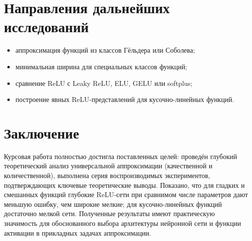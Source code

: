 \documentclass[12pt]{article}
\begin{document}
\section{Направления дальнейших исследований}

\begin{itemize}
	\item аппроксимация функций из классов Гёльдера или Соболева;
	\item минимальная ширина для специальных классов функций;
	\item сравнение ReLU с Leaky ReLU, ELU, GELU или softplus;
	\item построение явных ReLU-представлений для кусочно-линейных функций.
\end{itemize}
	
	\section{Заключение}
	
	Курсовая работа полностью достигла поставленных целей: проведён глубокий теоретический анализ универсальной аппроксимации (качественной и количественной), выполнена серия воспроизводимых экспериментов, подтверждающих ключевые теоретические выводы. Показано, что для гладких и смешанных функций глубокие ReLU-сети при сравнимом числе параметров дают меньшую ошибку, чем широкие мелкие; для кусочно-линейных функций достаточно мелкой сети. Полученные результаты имеют практическую значимость для обоснованного выбора архитектуры нейронной сети и функции
	\vspace{5mm} активации в прикладных задачах аппроксимации.
	
\end{document}
